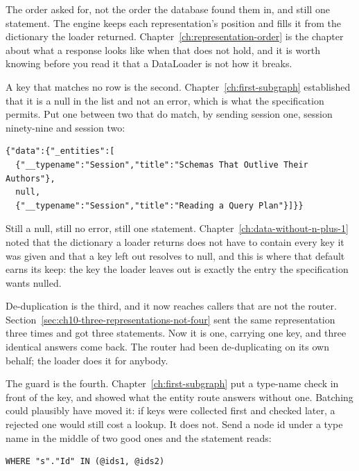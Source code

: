 The order asked for, not the order the database found them in, and still one
statement. The engine keeps each representation's position and fills it from the
dictionary the loader returned. Chapter~\ref{ch:representation-order} is the
chapter about what a response looks like when that does not hold, and it is
worth knowing before you read it that a DataLoader is not how it breaks.

%
A key that matches no row is the second. Chapter~\ref{ch:first-subgraph}
established that it is a null in the list and not an error, which is what the
specification permits. Put one between two that do match, by sending session
one, session ninety-nine and session two:

\begin{verbatim}
{"data":{"_entities":[
  {"__typename":"Session","title":"Schemas That Outlive Their Authors"},
  null,
  {"__typename":"Session","title":"Reading a Query Plan"}]}}
\end{verbatim}

Still a null, still no error, still one statement.
Chapter~\ref{ch:data-without-n-plus-1} noted that the dictionary a loader
returns does not have to contain every key it was given and that a key left out
resolves to null, and this is where that default earns its keep: the key the
loader leaves out is exactly the entry the specification wants nulled.

%
De-duplication is the third, and it now reaches callers that are not the
router. Section~\ref{sec:ch10-three-representations-not-four} sent the same
representation three times and got three statements. Now it is one, carrying
one key, and three identical answers come back. The router had been
de-duplicating on its own behalf; the loader does it for anybody.

%
The guard is the fourth. Chapter~\ref{ch:first-subgraph} put a type-name check
in front of the key, and showed what the entity route answers without one.
Batching could plausibly have moved it: if keys were collected first and
checked later, a rejected one would still cost a lookup. It does not. Send a
 node id under a  type name in the middle of two
good ones and the statement reads:

\begin{verbatim}
WHERE "s"."Id" IN (@ids1, @ids2)
\end{verbatim}

